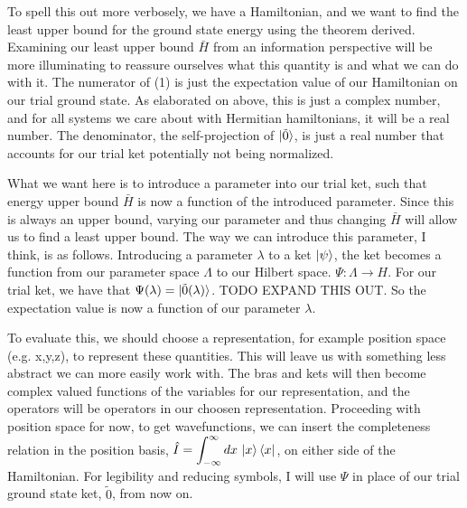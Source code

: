 \documentclass[12pt]{article}
\numberwithin{equation}{section}
\begin{document}
\hspace{1cm} To spell this out more verbosely, we have a Hamiltonian, and we want to find the least upper bound for the ground state energy using the theorem derived. Examining our least upper bound $\bar{H}$ from an information perspective will be more illuminating to reassure ourselves what this quantity is and what we can do with it. The numerator of (1) is just the expectation value of our Hamiltonian on our trial ground state. As elaborated on above, this is just a complex number, and for all systems we care about with Hermitian hamiltonians, it will be a real number. The denominator, the self-projection of $\ket{\tilde{0}}$, is just a real number that accounts for our trial ket potentially not being normalized.

\hspace{1cm} What we want here is to introduce a parameter into our trial ket, such that energy upper bound $\bar{H}$ is now a function of the introduced parameter. Since this is always an upper bound, varying our parameter and thus changing $\bar{H}$ will allow us to find a least upper bound. The way we can introduce this parameter, I think, is as follows. Introducing a parameter $\lambda$ to a ket $\ket{\psi}$, the ket becomes a function from our parameter space $\Lambda$ to our Hilbert space. $\Psi : \Lambda \rightarrow H$. For our trial ket, we have that $\Psi(\lambda) = \ket{\tilde{0}(\lambda)}$. TODO EXPAND THIS OUT. So the expectation value is now a function of our parameter $\lambda$. 

\hspace{1cm} To evaluate this, we should choose a representation, for example position space (e.g. x,y,z), to represent these quantities. This will leave us with something less abstract we can more easily work with. The bras and kets will then become complex valued functions of the variables for our representation, and the operators will be operators in our choosen representation. Proceeding with position space for now, to get wavefunctions, we can insert the completeness relation in the position basis, $\displaystyle \hat{I} = \int_{-\infty}^{\infty}dx \, \ket{x}\bra{x}$, on either side of the Hamiltonian. For legibility and reducing symbols, I will use $\Psi$ in place of our trial ground state ket, $\tilde{0}$, from now on.
\end{document}
